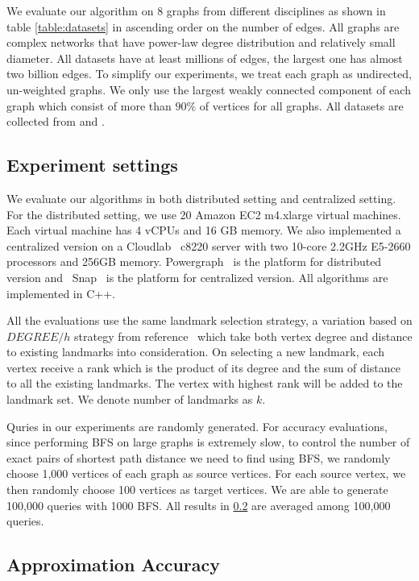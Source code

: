 We evaluate our algorithm on 8 graphs from different disciplines as shown in table \ref{table:datasets} in ascending order on the number of edges. All graphs are complex networks that have power-law degree distribution and relatively small diameter. All datasets have at least millions of edges, the largest one has almost two billion edges. To simplify our experiments, we treat each graph as undirected, un-weighted graphs. We only use the largest weakly connected component of each graph which consist of more than $90\%$ of vertices for all graphs. All datasets are collected from \cite{snapnets} and \cite{nr}.

\subsection{Experiment settings}
\label{eval_system}

We evaluate our algorithms in both distributed setting and centralized setting. For  the distributed setting, we use 20 Amazon EC2 m4.xlarge virtual machines. Each virtual machine has 4 vCPUs and 16 GB memory. We also implemented a centralized version on a Cloudlab~\cite{RicciEide:login14} c8220 server with two 10-core 2.2GHz E5-2660 processors and 256GB memory. Powergraph~\cite{180251} is the platform for distributed version and ~Snap~\cite{snapnets} is the platform for centralized version. All algorithms are implemented in C++. 

All the evaluations use the same landmark selection strategy, a variation based on $DEGREE/h$ strategy from reference~\cite{Potamias:2009:FSP:1645953.1646063} which take both vertex degree and distance to existing landmarks into consideration. On selecting a new landmark, each vertex receive a rank which is the product of its degree and the sum of distance to all the existing landmarks. The vertex with highest rank will be added to the landmark set. We denote number of landmarks as $k$.

Quries in our experiments are randomly generated. For accuracy evaluations, since performing BFS on large graphs is extremely slow, to control the number of exact pairs of shortest path distance we need to find using BFS, we randomly choose 1,000 vertices of each graph as source vertices. For each source vertex, we then randomly choose 100 vertices as target vertices. We are able to generate 100,000 queries with 1000 BFS. All results in \ref{eval_accuracy} are averaged among 100,000 queries.

\subsection{Approximation Accuracy}
\label{eval_accuracy}

